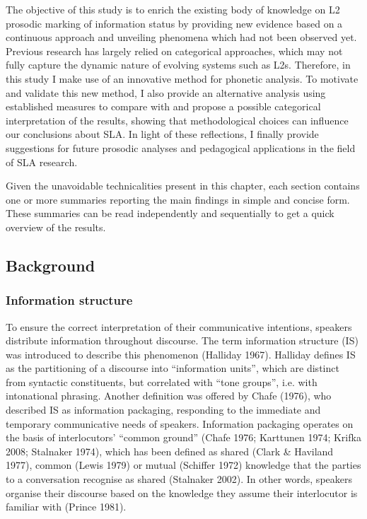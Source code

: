 \begin{styleStandard}
The objective of this study is to enrich the existing body of knowledge on L2 prosodic marking of information status by providing new evidence based on a continuous approach and unveiling phenomena which had not been observed yet. Previous research has largely relied on categorical approaches, which may not fully capture the dynamic nature of evolving systems such as L2s. Therefore, in this study I make use of an innovative method for phonetic analysis. To motivate and validate this new method, I also provide an alternative analysis using established measures to compare with and propose a possible categorical interpretation of the results, showing that methodological choices can influence our conclusions about SLA. In light of these reflections, I finally provide suggestions for future prosodic analyses and pedagogical applications in the field of SLA research.
\end{styleStandard}

\begin{styleStandard}
Given the unavoidable technicalities present in this chapter, each section contains one or more summaries reporting the main findings in simple and concise form. These summaries can be read independently and sequentially to get a quick overview of the results.
\end{styleStandard}

\subsection{Background }
\hypertarget{Toc191305883}{}\subsubsection{Information structure}
\hypertarget{Toc191305884}{}\begin{styleStandard}
To ensure the correct interpretation of their communicative intentions, speakers distribute information throughout discourse. The term information structure (IS) was introduced to describe this phenomenon (Halliday 1967). Halliday defines IS as the partitioning of a discourse into “information units”, which are distinct from syntactic constituents, but correlated with “tone groups”, i.e. with intonational phrasing. Another definition was offered by Chafe (1976), who described IS as information packaging, responding to the immediate and temporary communicative needs of speakers. Information packaging operates on the basis of interlocutors’ “common ground” (Chafe 1976; Karttunen 1974; Krifka 2008; Stalnaker 1974), which has been defined as shared (Clark \& Haviland 1977), common (Lewis 1979) or mutual (Schiffer 1972) knowledge that the parties to a conversation recognise as shared (Stalnaker 2002). In other words, speakers organise their discourse based on the knowledge they assume their interlocutor is familiar with (Prince 1981).
\end{styleStandard}

